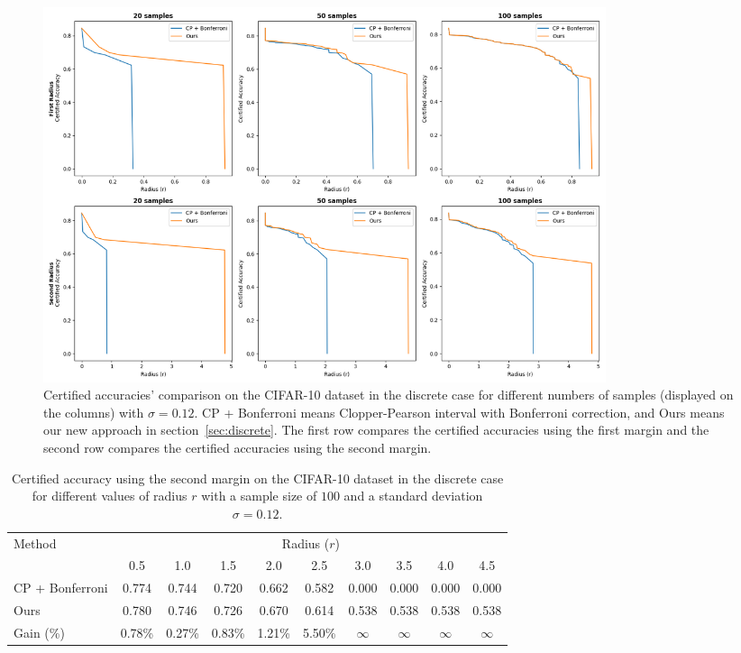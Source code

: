\begin{figure}[htbp]
    \centering
    \includegraphics[width=0.8\textwidth]{images/discrete_num}
    \caption{Certified accuracies' comparison on the CIFAR-10 dataset in the discrete case for different numbers of samples (displayed on the columns) with $\sigma = 0.12$. CP + Bonferroni means Clopper-Pearson interval with Bonferroni correction, and Ours means our new approach in section~\ref{sec:discrete}. The first row compares the certified accuracies using the first margin and the second row compares the certified accuracies using the second margin.}
    \label{fig:discrete_num}
\end{figure}

\begin{table}[htbp]
    \centering
    \caption{Certified accuracy using the second margin on the CIFAR-10 dataset in the discrete case for different values of radius $r$ with a sample size of $100$ and a standard deviation $\sigma = 0.12$.}
    \label{tab:simplified-certified-accuracy}
    \renewcommand{\arraystretch}{1.2}
    \begin{tabular}{l*{9}{c}}
        \toprule
        Method & \multicolumn{9}{c}{Radius ($r$)} \\
        \cmidrule(l){2-10}
        & 0.5 & 1.0 & 1.5 & 2.0 & 2.5 & 3.0 & 3.5 & 4.0 & 4.5 \\
        \midrule
        CP + Bonferroni & 0.774 & 0.744 & 0.720 & 0.662 & 0.582 & 0.000 & 0.000 & 0.000 & 0.000 \\
        Ours              & 0.780 & 0.746 & 0.726 & 0.670 & 0.614 & 0.538 & 0.538 & 0.538 & 0.538 \\
        Gain (\%) & 0.78\% & 0.27\% & 0.83\% & 1.21\% & 5.50\% & $\infty$ & $\infty$ & $\infty$ & $\infty$ \\
        \bottomrule
    \end{tabular}
\end{table}

